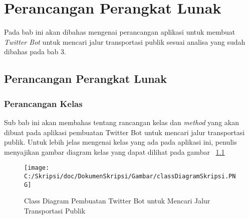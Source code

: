 \chapter{Perancangan Perangkat Lunak}
\label{chap:perancangan perangkat lunak}

Pada bab ini akan dibahas mengenai perancangan aplikasi untuk membuat \textit{Twitter Bot} untuk mencari jalur transportasi publik sesuai analisa yang sudah dibahas pada bab 3.

\section{Perancangan Perangkat Lunak}

\subsection{Perancangan Kelas}
Sub bab ini akan membahas tentang rancangan kelas dan \textit{method} yang akan dibuat pada aplikasi pembuatan Twitter Bot untuk mencari jalur transportasi publik. Untuk lebih jelas mengenai kelas yang ada pada aplikasi ini, penulis menyajikan gambar diagram kelas yang dapat dilihat pada gambar ~\ref{fig:classDiagramSkripsi}

\begin{figure}[htbp]
	\centering
		\texttt{[image: C:/Skripsi/doc/DokumenSkripsi/Gambar/classDiagramSkripsi.PNG]}
	\caption{Class Diagram Pembuatan Twitter Bot untuk Mencari Jalur Transportasi Publik}
	\label{fig:classDiagramSkripsi}
\end{figure}


